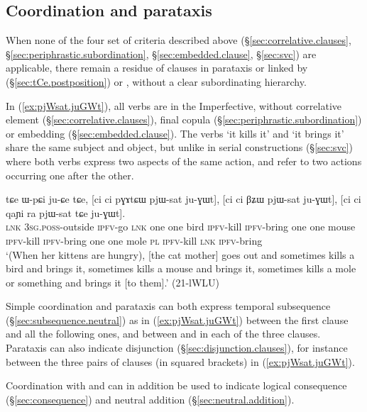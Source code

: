 \subsection{Coordination and parataxis} \label{sec:coordination}
When none of the four set of criteria described above (§\ref{sec:correlative.clauses}, §\ref{sec:periphrastic.subordination}, §\ref{sec:embedded.clause}, §\ref{sec:svc}) are applicable, there remain a residue of clauses in parataxis or linked by  (§\ref{sec:tCe.postposition}) or , without a clear subordinating hierarchy. 

In (\ref{ex:pjWsat.juGWt}), all verbs are in the Imperfective, without correlative element (§\ref{sec:correlative.clauses}), final copula (§\ref{sec:periphrastic.subordination}) or embedding (§\ref{sec:embedded.clause}). The verbs  `it kills it' and  `it brings it' share the same subject and object, but unlike in serial constructions (§\ref{sec:svc}) where both verbs express two aspects of the same action,  and  refer to two actions occurring one after the other.


\begin{exe}
\ex \label{ex:pjWsat.juGWt}
\gll tɕe ɯ-pɕi ju-ɕe tɕe, [ci ci pɣɤtɕɯ pjɯ-sat ju-ɣɯt], [ci ci βʑɯ pjɯ-sat ju-ɣɯt], [ci ci qaɲi ra pjɯ-sat tɕe ju-ɣɯt]. \\
\textsc{lnk} \textsc{3sg}.\textsc{poss}-outside \textsc{ipfv}-go \textsc{lnk} one one bird \textsc{ipfv}-kill \textsc{ipfv}-bring one one mouse \textsc{ipfv}-kill \textsc{ipfv}-bring one one mole \textsc{pl} \textsc{ipfv}-kill \textsc{lnk} \textsc{ipfv}-bring \\
\glt `(When her kittens are hungry), [the cat mother] goes out and sometimes kills a bird and brings it, sometimes kills a mouse and brings it, sometimes kills a mole or something and brings it [to them].' (21-lWLU)
\end{exe}

Simple coordination and parataxis can both express temporal subsequence (§\ref{sec:subsequence.neutral}) as in (\ref{ex:pjWsat.juGWt}) between the first clause and all the following ones, and between  and  in each of the three clauses. Parataxis can also indicate disjunction (§\ref{sec:disjunction.clauses}), for instance between the three pairs of clauses (in squared brackets) in (\ref{ex:pjWsat.juGWt}). 

Coordination with  and  can in addition be used to indicate logical consequence (§\ref{sec:consequence}) and neutral addition (§\ref{sec:neutral.addition}).

